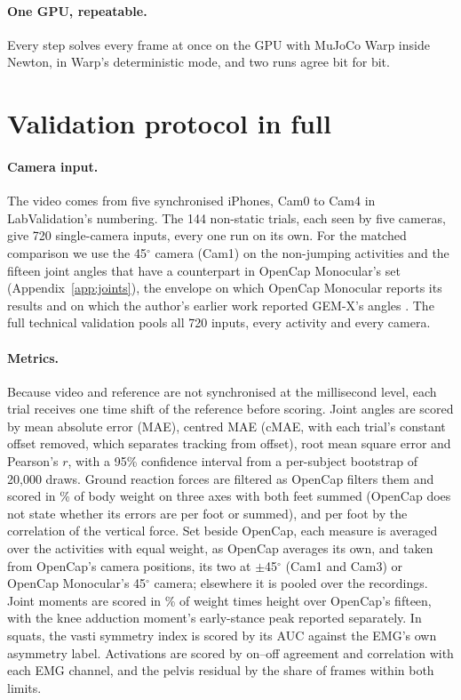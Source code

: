 \documentclass[11pt]{article}
\newcommand{\dg}{\ensuremath{^\circ}}
\begin{document}
\paragraph{One GPU, repeatable.} Every step solves every frame at once on the GPU with MuJoCo Warp inside Newton, in
Warp's deterministic mode, and two runs agree bit for bit.
\section{Validation protocol in full}
\label{app:protocol}

\paragraph{Camera input.} The video comes from five synchronised iPhones, Cam0 to Cam4 in LabValidation's numbering.
The 144 non-static trials, each seen by five cameras, give 720 single-camera inputs, every one run on its own. For the
matched comparison we use the 45\dg{} camera (Cam1) on the non-jumping activities and the fifteen joint angles that
have a counterpart in OpenCap Monocular's set (Appendix~\ref{app:joints}), the envelope on which OpenCap Monocular
reports its results \cite{gilon2026monocular} and on which the author's earlier work reported GEM-X's angles
\cite{kardolus2026direct}. The full technical validation pools all 720 inputs, every activity and every camera.

\paragraph{Metrics.} Because video and reference are not synchronised at the millisecond level, each trial receives
one time shift of the reference before scoring. Joint angles are scored by mean absolute error (MAE), centred MAE
(cMAE, with each trial's constant offset removed, which separates tracking from offset), root mean square error and
Pearson's $r$, with a 95\% confidence interval from a per-subject bootstrap of 20{,}000 draws. Ground reaction forces
are filtered as OpenCap filters them and scored in \% of body weight on three axes with both feet summed (OpenCap does
not state whether its errors are per foot or summed), and per foot by the correlation of the vertical force. Set
beside OpenCap, each measure is averaged over the activities with equal weight, as OpenCap averages its own, and
taken from OpenCap's camera positions, its two at $\pm$45\dg{} (Cam1 and Cam3) or OpenCap Monocular's 45\dg{} camera;
elsewhere it is pooled over the recordings. Joint moments are scored in \% of weight times height over OpenCap's fifteen, with
the knee adduction moment's early-stance peak reported separately. In squats, the vasti symmetry index is scored by its
AUC against the EMG's own asymmetry label. Activations are scored by on--off agreement and correlation with each EMG
channel, and the pelvis residual by the share of frames within both limits.
\end{document}
